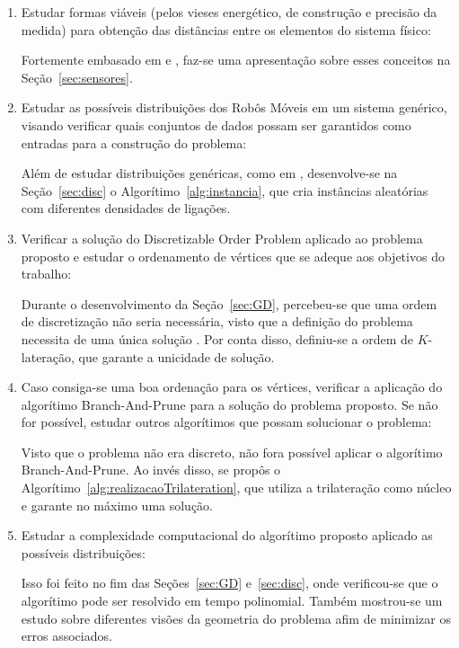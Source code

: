 \documentclass[a4paper,12pt]{article}
\begin{document}
	\begin{enumerate}
		
		\item Estudar formas viáveis (pelos vieses energético, de construção e precisão da medida) para obtenção das distâncias entre os elementos do sistema físico:
		
		Fortemente embasado em \cite{savvides2001dynamic} e \cite{sensorsForMobileRobots}, faz-se uma apresentação sobre esses conceitos na Seção~\ref{sec:sensores}. 
		
		\item Estudar as possíveis distribuições dos Robôs Móveis em um sistema genérico, visando verificar quais conjuntos de dados possam ser garantidos como entradas para a construção do problema:
		
		Além de estudar distribuições genéricas, como em \cite{eren2004rigidity}, desenvolve-se na Seção~\ref{sec:disc} o Algorítimo~\ref{alg:instancia}, que cria instâncias aleatórias com diferentes densidades de ligações.
		
		\item Verificar a solução do Discretizable Order Problem \cite{carlileGDandAplications} aplicado ao problema proposto e estudar o ordenamento de vértices que se adeque aos objetivos do trabalho:
		
		Durante o desenvolvimento da Seção~\ref{sec:GD}, percebeu-se que uma ordem de discretização não seria necessária, visto que a definição do problema necessita de uma única solução \cite{libertiEDG}. Por conta disso, definiu-se a ordem de $K$-lateração, que garante a unicidade de solução.
		
		\item Caso consiga-se uma boa ordenação para os vértices, verificar a aplicação do algorítimo Branch-And-Prune \cite{carlile:BP} para a solução do problema proposto. Se não for possível, estudar outros algorítimos que possam solucionar o problema:
		
		Visto que o problema não era discreto, não fora possível aplicar o algorítimo Branch-And-Prune. Ao invés disso, se propôs o Algorítimo~\ref{alg:realizacaoTrilateration}, que utiliza a trilateração como núcleo e garante no máximo uma solução.
		
		\item Estudar a complexidade computacional do algorítimo proposto aplicado as possíveis distribuições:
		
		Isso foi feito no fim das Seções~\ref{sec:GD} e~\ref{sec:disc}, onde verificou-se que o algorítimo pode ser resolvido em tempo polinomial. Também mostrou-se um estudo sobre diferentes visões da geometria do problema afim de minimizar os erros associados. 
		

\end{enumerate}
\end{document}
